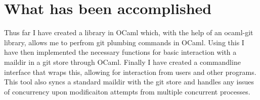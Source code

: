 \documentclass[12pt,a4paper,twoside]{article}
\begin{document}
\section*{What has been accomplished}

Thus far I have created a library in OCaml which, with the help of an ocaml-git library, allows me to perfrom git plumbing commands in OCaml. Using this I have then implemented the necessary functions for basic interaction with a maildir in a git store through OCaml. Finally I have created a commandline interface that wraps this, allowing for interaction from users and other programs. This tool also syncs a standard maildir with the git store and handles any issues of concurrency upon modificaiton attempts from multiple concurrent processes.
\end{document}
